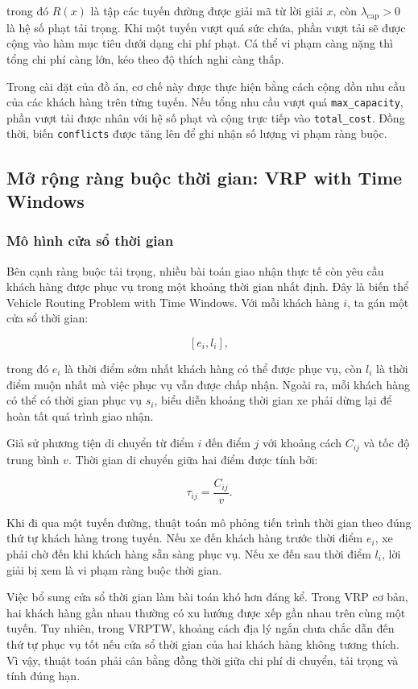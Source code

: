 \documentclass[12pt,a4paper]{article}
\numberwithin{figure}{subsection}
\begin{document}
trong đó $R(x)$ là tập các tuyến đường được giải mã từ lời giải $x$, còn $\lambda_{\text{cap}} > 0$ là hệ số phạt tải trọng. Khi một tuyến vượt quá sức chứa, phần vượt tải sẽ được cộng vào hàm mục tiêu dưới dạng chi phí phạt. Cá thể vi phạm càng nặng thì tổng chi phí càng lớn, kéo theo độ thích nghi càng thấp.

Trong cài đặt của đồ án, cơ chế này được thực hiện bằng cách cộng dồn nhu cầu của các khách hàng trên từng tuyến. Nếu tổng nhu cầu vượt quá \texttt{max\_capacity}, phần vượt tải được nhân với hệ số phạt và cộng trực tiếp vào \texttt{total\_cost}. Đồng thời, biến \texttt{conflicts} được tăng lên để ghi nhận số lượng vi phạm ràng buộc.

\subsection{Mở rộng ràng buộc thời gian: VRP with Time Windows}

\subsubsection{Mô hình cửa sổ thời gian}

Bên cạnh ràng buộc tải trọng, nhiều bài toán giao nhận thực tế còn yêu cầu khách hàng được phục vụ trong một khoảng thời gian nhất định. Đây là biến thể Vehicle Routing Problem with Time Windows. Với mỗi khách hàng $i$, ta gán một cửa sổ thời gian:

\[
[e_i, l_i],
\]

trong đó $e_i$ là thời điểm sớm nhất khách hàng có thể được phục vụ, còn $l_i$ là thời điểm muộn nhất mà việc phục vụ vẫn được chấp nhận. Ngoài ra, mỗi khách hàng có thể có thời gian phục vụ $s_i$, biểu diễn khoảng thời gian xe phải dừng lại để hoàn tất quá trình giao nhận.

Giả sử phương tiện di chuyển từ điểm $i$ đến điểm $j$ với khoảng cách $C_{ij}$ và tốc độ trung bình $v$. Thời gian di chuyển giữa hai điểm được tính bởi:

\[
\tau_{ij} = \frac{C_{ij}}{v}.
\]

Khi đi qua một tuyến đường, thuật toán mô phỏng tiến trình thời gian theo đúng thứ tự khách hàng trong tuyến. Nếu xe đến khách hàng trước thời điểm $e_i$, xe phải chờ đến khi khách hàng sẵn sàng phục vụ. Nếu xe đến sau thời điểm $l_i$, lời giải bị xem là vi phạm ràng buộc thời gian.

Việc bổ sung cửa sổ thời gian làm bài toán khó hơn đáng kể. Trong VRP cơ bản, hai khách hàng gần nhau thường có xu hướng được xếp gần nhau trên cùng một tuyến. Tuy nhiên, trong VRPTW, khoảng cách địa lý ngắn chưa chắc dẫn đến thứ tự phục vụ tốt nếu cửa sổ thời gian của hai khách hàng không tương thích. Vì vậy, thuật toán phải cân bằng đồng thời giữa chi phí di chuyển, tải trọng và tính đúng hạn.
\end{document}
